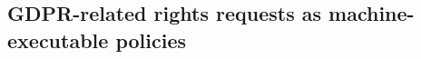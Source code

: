 \documentclass{IOS-Book-Article}     %
\begin{document}



\subsection{GDPR-related rights requests as machine-executable policies}
\label{sec:policies}
\end{document}
